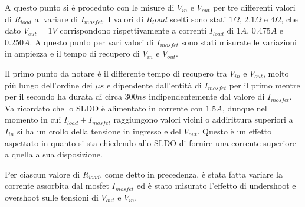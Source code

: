 A questo punto si è proceduto con le misure di $V_{in}$ e $V_{out}$ per tre differenti valori di $R_{load}$ al variare di $I_{mosfet}$. I valori di $R_load$ scelti sono stati $1 \Omega$, $2.1 \Omega$ e $4 \Omega$, che dato $V_{out}=1V$ corrispondono rispettivamente a correnti  $I_{load}$ di $1A$, $0.475 A$ e $0.250A$. A questo punto per vari valori di $I_{mosfet}$ sono stati misurate le variazioni in ampiezza e il tempo di recupero di $V_{in}$ e $V_{out}$.

Il primo punto da notare è il differente tempo di recupero tra $V_{in}$ e $V_{out}$, molto più lungo dell'ordine dei $\mu s$ e dipendente dall'entità di $I_{mosfet}$ per il primo mentre per il secondo ha durata di circa $300 ns$ indipendentemente dal valore di $I_{mosfet}$.
Va ricordato che lo SLDO è alimentato in corrente con $1.5A$, dunque nel momento in cui $I_{load}+I_{mosfet}$ raggiungono valori vicini o addirittura superiori  a $I_{in}$ si ha un crollo della tensione in ingresso e del $V_{out}$. Questo è un effetto aspettato in quanto si sta chiedendo allo SLDO di fornire una corrente superiore a quella a sua disposizione.


Per ciascun valore di $R_{load}$, come detto in precedenza, è stata fatta variare la corrente assorbita dal mosfet $I_{mosfet}$ ed è stato misurato l'effetto di undershoot e overshoot sulle tensioni di $V_{out}$ e $V_{in}$.
 

